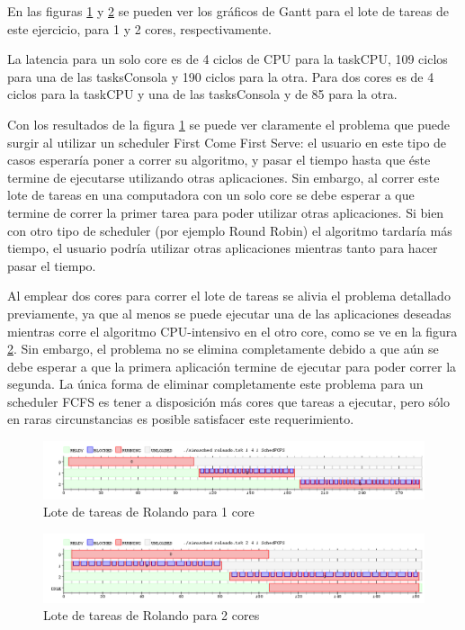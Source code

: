 \FloatBarrier
\par En las figuras \ref{fig:ej2-1core} y \ref{fig:ej2-2core} se pueden ver los gr\'aficos de Gantt para el lote de tareas de este ejercicio, para 1 y 2 cores, respectivamente.
\par La latencia para un solo core es de 4 ciclos de CPU para la taskCPU, 109 ciclos para una de las tasksConsola y 190 ciclos para la otra.
Para dos cores es de 4 ciclos para la taskCPU y una de las tasksConsola y de 85 para la otra.
\par Con los resultados de la figura \ref{fig:ej2-1core} se puede ver claramente el problema que puede surgir al utilizar un scheduler First Come First Serve: el usuario en este tipo de casos esperar\'ia poner a correr su algoritmo, y pasar el tiempo hasta que \'este termine de ejecutarse utilizando otras aplicaciones. 
Sin embargo, al correr este lote de tareas en una computadora con un solo core se debe esperar a que termine de correr la primer tarea para poder utilizar otras aplicaciones. 
Si bien con otro tipo de scheduler (por ejemplo Round Robin) el algoritmo tardar\'ia m\'as tiempo, el usuario podr\'ia utilizar otras aplicaciones mientras tanto para hacer pasar el tiempo.
\par Al emplear dos cores para correr el lote de tareas se alivia el problema detallado previamente, ya que al menos se puede ejecutar una de las aplicaciones deseadas mientras corre el algoritmo CPU-intensivo en el otro core, como se ve en la figura \ref{fig:ej2-2core}.
Sin embargo, el problema no se elimina completamente debido a que a\'un se debe esperar a que la primera aplicaci\'on termine de ejecutar para poder correr la segunda.
La \'unica forma de eliminar completamente este problema para un scheduler FCFS es tener a disposici\'on m\'as cores que tareas a ejecutar, pero s\'olo en raras circunstancias es posible satisfacer este requerimiento.
\begin{figure}[h]
\caption{Lote de tareas de Rolando para 1 core}
\label{fig:ej2-1core}
\includegraphics[width=0.9\columnwidth]{imgs/ej2-1core}
\end{figure}
\begin{figure}[h]
\caption{Lote de tareas de Rolando para 2 cores}
\label{fig:ej2-2core}
\includegraphics[width=0.9\columnwidth]{imgs/ej2-2core}
\end{figure}
\FloatBarrier
